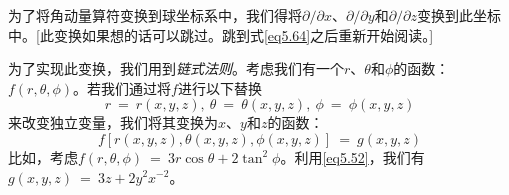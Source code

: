 \documentclass[12pt,a4paper,openany]{ctexbook}
\begin{document}
\begin{flushleft}
为了将角动量算符变换到球坐标系中，我们得将$\partial/\partial x$、$\partial/\partial y$和$\partial/\partial z$变换到此坐标中。[此变换如果想的话可以跳过。跳到式\eqref{eq5.64}之后重新开始阅读。]
\begin{center}
    \begin{minipage}{0.8\textwidth}
    \small
    为了实现此变换，我们用到\textit{链式法则}。考虑我们有一个$r$、$\theta$和$\phi$的函数：$f(r,\theta,\phi)$。若我们通过将$f$进行以下替换
    \begin{equation*}
        r\ =\ r(x,y,z),\ \theta\ =\ \theta(x,y,z),\ \phi\ =\ \phi(x,y,z)
    \end{equation*}
    来改变独立变量，我们将其变换为$x$、$y$和$z$的函数：
    \begin{equation*}
        f[r(x,y,z),\theta(x,y,z),\phi(x,y,z)]\ =\ g(x,y,z)
    \end{equation*}
    比如，考虑$f(r,\theta,\phi)\ =\ 3r\cos\theta+2\tan^2\phi$。利用\eqref{eq5.52}，我们有$g(x,y,z)\ =\ 3z+2y^2x^{-2}$。


\end{minipage}
\end{center}
\end{flushleft}
\end{document}
